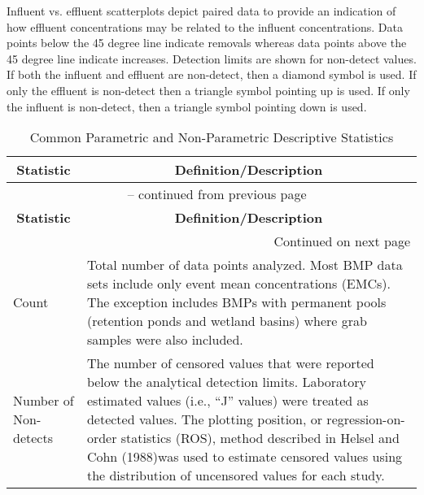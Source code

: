 Influent vs. effluent scatterplots depict paired data to provide an indication
of how effluent concentrations may be related to the influent concentrations.
Data points below the 45 degree line indicate removals whereas data points
above the 45 degree line indicate increases.  Detection limits are shown for
non-detect values. If both the influent and effluent are non-detect, then a
diamond symbol is used.  If only the effluent is non-detect then a triangle
symbol pointing up is used.  If only the influent is non-detect, then a
triangle symbol pointing down is used.

\begin{longtable}[pt]{p{1.5in} p{4in}}
    \caption{Common Parametric and Non-Parametric Descriptive Statistics}
    \label{tab:StatDescr} \\

    \toprule
    \multicolumn{1}{c}{\textbf{Statistic}} &
    \multicolumn{1}{c}{\textbf{Definition/Description}} \\
    \toprule
    \endfirsthead

    \multicolumn{2}{c}{{
        \tablename\ \thetable{} -- continued from previous page
    }} \\

    \toprule
    \multicolumn{1}{c}{\textbf{Statistic}} &
    \multicolumn{1}{c}{\textbf{Definition/Description}} \\
    \toprule
    \endhead

    \multicolumn{2}{r}{{Continued on next page}} \\
    \endfoot

    \bottomrule
    \endlastfoot

    Count & Total number of data points analyzed.  Most BMP data sets include
    only event mean concentrations (EMCs).  The exception includes BMPs with
    permanent pools (retention ponds and wetland basins) where grab samples
    were also included.  \\

    \midrule
    Number of Non-detects & The number of censored values that were reported
    below the analytical detection limits. Laboratory estimated values (i.e.,
    ``J'' values) were treated as detected values. The plotting position, or
    regression-on-order statistics (ROS), method described in Helsel and Cohn
    (1988)\footnotemark[4] was used to estimate censored values using the
    distribution of uncensored values for each study.   \\


\end{longtable}
